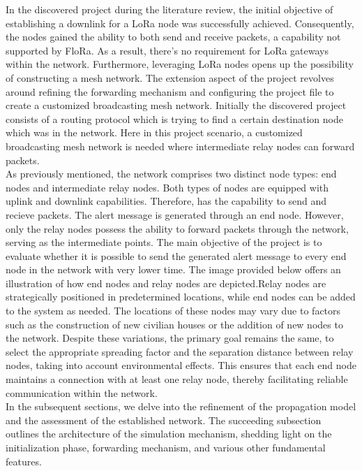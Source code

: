 In the discovered project during the literature review, the initial objective of establishing a downlink for a LoRa node was successfully achieved. Consequently, the nodes gained the ability to both send and receive packets, a capability not supported by FloRa. As a result, there's no requirement for LoRa gateways within the network. Furthermore, leveraging LoRa nodes opens up the possibility of constructing a mesh network. The extension aspect of the project revolves around refining the forwarding mechanism and configuring the project file to create a customized broadcasting mesh network. Initially the discovered project consists of a routing protocol which is trying to find a certain destination node which was in the network. Here in this project scenario, a customized broadcasting mesh network is needed where intermediate relay nodes can forward packets.\\

As previously mentioned, the network comprises two distinct node types: end nodes and intermediate relay nodes. Both types of nodes are equipped with uplink and downlink capabilities. Therefore, has the capability to send and recieve packets. The alert message is generated through 
 an end node. However, only the relay nodes possess the ability to forward packets through the network, serving as the intermediate points. The main objective of the project is to evaluate whether it is possible to send the generated alert message to every end node in the network with very lower time. The image provided below offers an illustration of how end nodes and relay nodes are depicted.Relay nodes are strategically positioned in predetermined locations, while end nodes can be added to the system as needed. The locations of these nodes may vary due to factors such as the construction of new civilian houses or the addition of new nodes to the network. Despite these variations, the primary goal remains the same, to select the appropriate spreading factor and the separation distance between relay nodes, taking into account environmental effects. This ensures that each end node maintains a connection with at least one relay node, thereby facilitating reliable communication within the network. \\

 In the subsequent sections, we delve into the refinement of the propagation model and the assessment of the established network. The succeeding subsection outlines the architecture of the simulation mechanism, shedding light on the initialization phase, forwarding mechanism, and various other fundamental features.\\


